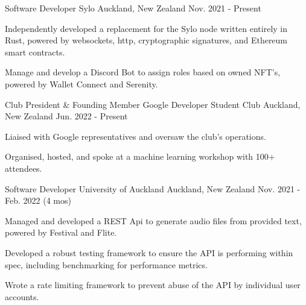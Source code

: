 
\begin{cventries}

  \cventry
    {Software Developer} %
    {Sylo} %
    {Auckland, New Zealand} %
    {Nov. 2021 - Present} %
    {
      \begin{cvitems} %
        \item {Independently developed a replacement for the Sylo node written entirely in Rust, powered by websockets, http, cryptographic signatures, and Ethereum smart contracts.}
        \item {Manage and develop a Discord Bot to assign roles based on owned NFT's, powered by Wallet Connect and Serenity.}
      \end{cvitems}
    }

  \cventry
    {Club President \& Founding Member} %
    {Google Developer Student Club} %
    {Auckland, New Zealand} %
    {Jun. 2022 - Present} %
    {
      \begin{cvitems} %
        \item {Liaised with Google representatives and oversaw the club's operations.}
        \item {Organised, hosted, and spoke at a machine learning workshop with 100+ attendees.}
      \end{cvitems}
    }

  \cventry
    {Software Developer} %
    {University of Auckland} %
    {Auckland, New Zealand} %
    {Nov. 2021 - Feb. 2022 (4 mos)} %
    {
      \begin{cvitems} %
        \item {Managed and developed a REST Api to generate audio files from provided text, powered by Festival and Flite.}
        \item {Developed a robust testing framework to ensure the API is performing within spec, including benchmarking for performance metrics.}
        \item {Wrote a rate limiting framework to prevent abuse of the API by individual user accounts.}
      \end{cvitems}
    }



\end{cventries}
